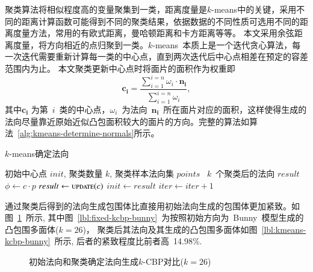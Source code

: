 聚类算法将相似程度高的变量聚集到一类，距离度量是$k$-means中的关键，采用不同的距离计算函数可能得到不同的聚类结果，依据数据的不同性质可选用不同的距离度量方法，常用的有欧式距离，曼哈顿距离和卡方距离等等。
本文采用余弦距离度量，将方向相近的点归聚到一类。$k$-means~本质上是一个迭代贪心算法，每一次迭代需要重新计算每一类的中心点，直到两次迭代后中心点相差在预定的容差范围内为止。
本文聚类更新中心点时将面片的面积作为权重即
\begin{equation}
\label{equ:kmeans-update-center}
\bm{c_i}=\frac{\sum_{i=1}^{i=n} \omega_i \cdot \bm{n_i} } {\sum_{i=1}^{i=n} \omega_i}
,
\end{equation}
其中$\bm{c_i}$
为第~$i$~类的中心点，$\omega_i$~为法向~$\bm{n_i}$~所在面片对应的面积，这样使得生成的法向尽量靠近原始近似凸包面积较大的面片的方向。完整的算法如算法~\ref{alg:kmeans-determine-normals}所示。

\begin{algorithm}
\small
\caption{$k$-means确定法向}
\label{alg:kmeans-determine-normals}
\begin{algorithmic}[1]
\Require
初始中心点 $init$, 聚类数量 $k$, 聚类样本法向集 $points$
\Ensure
~$k$~个聚类后的法向 $result$
        \State $\phi \gets c \cdot p$ 
    \EndFor
    \State $result \gets \Call{update}{c}$ 
        \State {}
        \State {}
    \Else
        \State $init \gets result $
        \State $iter \gets iter+1 $
    \EndIf
    \EndFor
  \EndFor
\EndFunction
\end{algorithmic}
\end{algorithm}

通过聚类后得到的法向生成包围体比直接用初始法向生成的包围体更加紧致。如图~\ref{lbl:kemans-fixed-kcbp}~所示, 
其中图~\ref{lbl:fixed-kcbp-bunny}~为按照初始方向为~Bunny~模型生成的凸包围多面体($k=26$)，
聚类后其法向及其生成的凸包围多面体如图~\ref{lbl:kmeans-kcbp-bunny}~所示, 后者的紧致程度比前者高~14.98\%.

\begin{figure}[htbp]
\setcounter{subfigure}{0}
  \centering
  \hspace{3em}%
  \hspace{3em}%
  \caption{初始法向和聚类确定法向生成$k$-CBP对比($k=26$)}
  \label{lbl:kemans-fixed-kcbp}
\end{figure}


